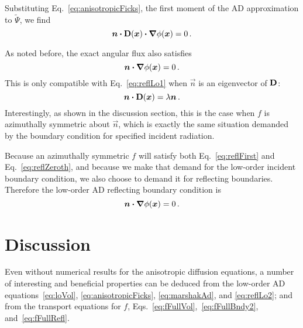 Substituting Eq.~\eqref{eq:anisotropicFicks}, the first moment of the AD
approximation to $\tilde\Psi$, we find
\begin{equation}\label{eq:reflLo1}
  \bm{n} \bm{\cdot} \mathbf{D}(\bm{x}) \bm{\cdot} \bm{\nabla} \phi(\bm{x}) = 0\,.
\end{equation}

As noted before, the exact angular flux also satisfies
\begin{equation}\label{eq:reflZeroth}
  \bm{n}\bm{\cdot}\bm{\nabla} \phi(\bm{x}) = 0 \,.
\end{equation}
This is only compatible with Eq.~\eqref{eq:reflLo1} when $\vec{n}$ is an
eigenvector of $\mathbf{D}$:
\begin{equation*}
  \bm{n} \bm{\cdot} \mathbf{D}(\bm{x}) = \lambda \bm{n}\,.
\end{equation*}
Interestingly, as shown in the discussion section, this is the case when $f$ is
azimuthally symmetric about
$\vec{n}$, which is exactly the same situation demanded by the boundary
condition for specified incident radiation.

Because an azimuthally symmetric $f$ will satisfy both Eq.~\eqref{eq:reflFirst}
and Eq.~\eqref{eq:reflZeroth}, and because we make that demand for the low-order
incident boundary condition, we also choose to demand it for reflecting
boundaries. Therefore the low-order AD reflecting boundary condition is
\begin{equation}\label{eq:reflLo2}
  \bm{n} \bm{\cdot} \bm{\nabla} \phi(\bm{x}) = 0\,.
\end{equation}



\section{Discussion}
Even without numerical results for the anisotropic diffusion equations, a
number of interesting and beneficial properties can be deduced from the
low-order AD equations~\eqref{eq:loVol}, \eqref{eq:anisotropicFicks}, 
\eqref{eq:marshakAd}, and \eqref{eq:reflLo2}; and from the transport equations
for $f$, Eqs.~\eqref{eq:fFullVol},~\eqref{eq:fFullBndy2},
and~\eqref{eq:fFullRefl}.

